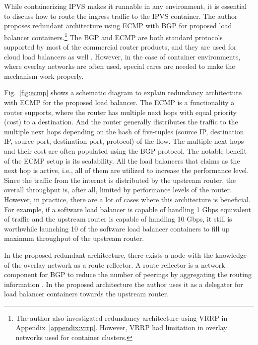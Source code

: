 While containerizing IPVS makes it runnable in any environment, it is essential to discuss how to route the ingress traffic to the IPVS container.
The author proposes redundant architecture using ECMP with BGP for proposed load balancer containers.\footnote{The author also investigated redundancy architecture using VRRP in Appendix~\ref{appendix:vrrp}. However, VRRP had limitation in overlay networks used for container clusters.}
The BGP and ECMP are both standard protocols supported by most of the commercial router products, and they are used for cloud load balancers as well \cite{eisenbud2016maglev,patel2013ananta}.
However, in the case of container environments, where overlay networks are often used, special cares are needed to make the mechanism work properly.

Fig.~\ref{fig:ecmp} shows a schematic diagram to explain redundancy architecture with ECMP for the proposed load balancer.
%
The ECMP is a functionality a router supports, where the router has multiple next hops with equal priority (cost) to a destination.
And the router generally distributes the traffic to the multiple next hops depending on the hash of five-tuples (source IP, destination IP, source port, destination port, protocol) of the flow.
The multiple next hops and their cost are often populated using the BGP protocol.
%
The notable benefit of the ECMP setup is its scalability.
All the load balancers that claims as the next hop is active, i.e., all of them are utilized to increase the performance level.
Since the traffic from the internet is distributed by the upstream router, the overall throughput is, after all, limited by performance levels of the router.
However, in practice, there are a lot of cases where this architecture is beneficial.
For example, if a software load balancer is capable of handling 1 Gbps equivalent of traffic and the upstream router is capable of handling 10 Gbps, it still is worthwhile launching 10 of the software load balancer containers to fill up maximum throughput of the upstream router.

%
In the proposed redundant architecture, there exists a node with the knowledge of the overlay network as a route reflector.
A route reflector is a network component for BGP to reduce the number of peerings by aggregating the routing information \cite{rfc4456}.
In the proposed architecture the author uses it as a delegater for load balancer containers towards the upstream router.

